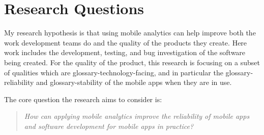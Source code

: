 \section{Research Questions}
\label{section-research-questions}



My research hypothesis is that using mobile analytics can help improve both the work development teams do and the quality of the products they create. Here work includes the development, testing, and bug investigation of the software being created. For the quality of the product, this research is focusing on a subset of qualities which are \gls{glossary-technology-facing}, %
and in particular the \gls{glossary-reliability} and \gls{glossary-stability} of the mobile apps when they are in use.

The core question the research aims to consider is:

\begin{quote}
  \emph{How can applying mobile analytics improve the reliability of mobile apps and software development for mobile apps in practice?}~\label{overall-research-question}
\end{quote}

